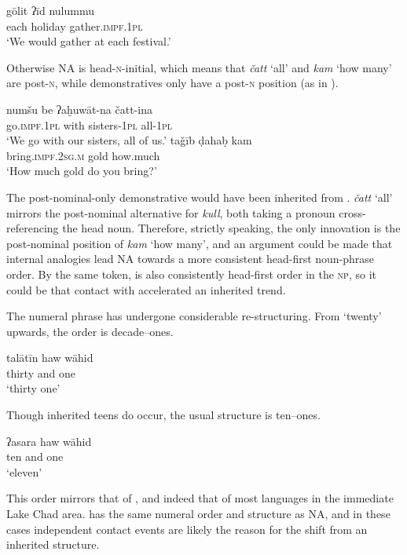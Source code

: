 \documentclass[output=paper]{langsci/langscibook}
\begin{document}
\ea \gll gōlit ʔīd nulummu\\
     each holiday gather\textsc{.impf.1pl}\\
\glt ‘We would gather at each festival.’
\z

Otherwise NA is head-\textsc{n}-initial, which means that \textit{čatt} ‘all’ and \textit{kam} ‘how many’ are post-\textsc{n}, while {demonstratives} only have a post-\textsc{n} position (as in ).

\ea \gll numšu be ʔaḫuwāt-na čatt-ina\\
     go.\textsc{impf.1pl} with sisters-1\textsc{pl} all-\textsc{1pl}\\
\glt ‘We go with our sisters, all of us.’
\ex \gll taǧīb ḍahaḅ kam\\
     bring.\textsc{impf.2sg.m} gold how.much\\
\glt ‘How much gold do you bring?’
\z

The post-nominal-only demonstrative would have been inherited from . \textit{čatt} ‘all’ mirrors the post-nominal alternative for \textit{kull}, both taking a pronoun cross-referencing the head noun. Therefore, strictly speaking, the only innovation is the post-nominal position of \textit{kam} ‘how many’, and an argument could be made that internal analogies lead NA towards a more consistent head-first noun-phrase order. By the same token,  is also consistently head-first order in the \textsc{np}, so it could be that contact with  accelerated an inherited trend.

The numeral phrase has undergone considerable re-structuring. From `twenty' upwards, the order is decade--ones.

\ea \gll talātīn haw wāhid\\
     thirty and one\\
\glt ‘thirty one’
\z

Though inherited teens do occur, the usual structure is ten--ones.

\ea \gll ʔasara haw wāhid\\
     ten and one\\
\glt ‘eleven’
\z

This order mirrors that of  \citep[203]{Hutchison1981}, and indeed that of most languages in the immediate {Lake Chad} area.   has the same numeral order and structure as NA, and in these cases independent contact events are likely the reason for the shift from an inherited structure.
\end{document}
